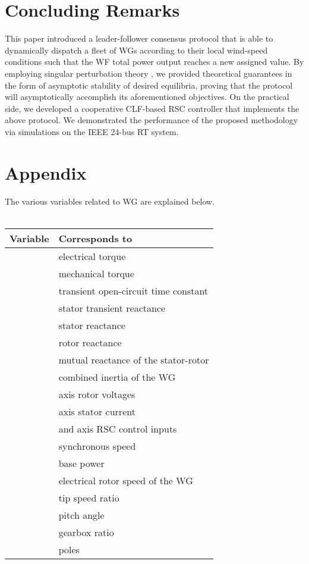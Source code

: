 \documentclass[letterpaper, 10 pt, conference]{ieeeconf}
\begin{document}
\section{Concluding Remarks}
This paper introduced a leader-follower consensus protocol that is able to dynamically dispatch a fleet of WGs according to their local wind-speed conditions such that the WF total power output reaches a new assigned value. By employing singular perturbation theory \cite{khalil}, we provided theoretical guarantees in the form of asymptotic stability of desired equilibria, proving that the protocol will asymptotically accomplish its aforementioned objectives.  On the practical side, we developed a cooperative CLF-based RSC controller that implements the above protocol.  We demonstrated the performance of the proposed methodology via simulations on the IEEE 24-bus RT system.
\section{Appendix}
The various variables related to WG  are explained below.\\\\
 \begin{tabular}{| l | l | }
\hline
\textbf{Variable} & \textbf{Corresponds to} \\\hline
  & electrical torque \\\hline
  &  mechanical torque \\\hline
  & transient open-circuit time constant\\\hline
  &  stator transient reactance\\\hline
  &  stator reactance \\\hline
  & rotor reactance\\\hline
  & mutual reactance of the stator-rotor\\\hline
  & combined inertia of the WG\\\hline
  &   axis rotor voltages\\ 
 \hline
  &  axis stator current \\ \hline
    &   and  axis RSC control inputs \\\hline
   & synchronous speed  \\\hline
   & base power \\\hline
  &  electrical rotor speed of the WG \\\hline
   & tip speed ratio\\\hline
   &  pitch angle\\\hline
  &  gearbox ratio\\\hline
  &  poles\\\hline
 \end{tabular}
 



\nocite{*}
\IEEEpeerreviewmaketitle

{}
\end{document}
